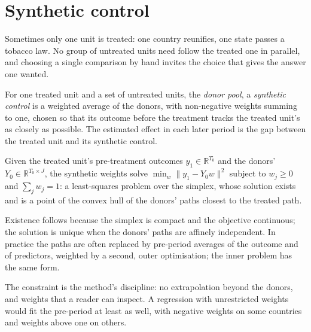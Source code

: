 \section{Synthetic control}\label{sec:b3:difference-in-differences:synthetic}

Sometimes only one unit is treated: one country reunifies, one state passes a
tobacco law. No group of untreated units need follow the treated one in
parallel, and choosing a single comparison by hand invites the choice that
gives the answer one wanted.

\begin{definition}\label{def:b3:difference-in-differences:synthetic-control}
For one treated unit and a set of untreated units, the \emph{donor pool}, a
\emph{synthetic control} is a weighted average of the donors, with
non-negative weights summing to one, chosen so that its outcome before the
treatment tracks the treated unit's as closely as possible. The estimated
effect in each later period is the gap between the treated unit and its
synthetic control.
\end{definition}

\begin{proposition}\label{prop:b3:difference-in-differences:synth}
Given the treated unit's pre-treatment outcomes $y_1 \in \mathbb R^{T_0}$ and
the donors' $Y_0 \in \mathbb R^{T_0 \times J}$, the synthetic weights solve
$\min_w \lVert y_1 - Y_0 w \rVert^2$ subject to $w_j \ge 0$ and $\sum_j w_j = 1$:
a least-squares problem over the simplex, whose solution exists and is a point
of the convex hull of the donors' paths closest to the treated path.
\end{proposition}

\admitted
Existence follows because the simplex is compact and the objective continuous;
the solution is unique when the donors' paths are affinely independent. In
practice the paths are often replaced by pre-period averages of the outcome and
of predictors, weighted by a second, outer optimisation; the inner problem has
the same form.

The constraint is the method's discipline: no extrapolation beyond the donors,
and weights that a reader can inspect. A regression with unrestricted weights
would fit the pre-period at least as well, with negative weights on some
countries and weights above one on others.

